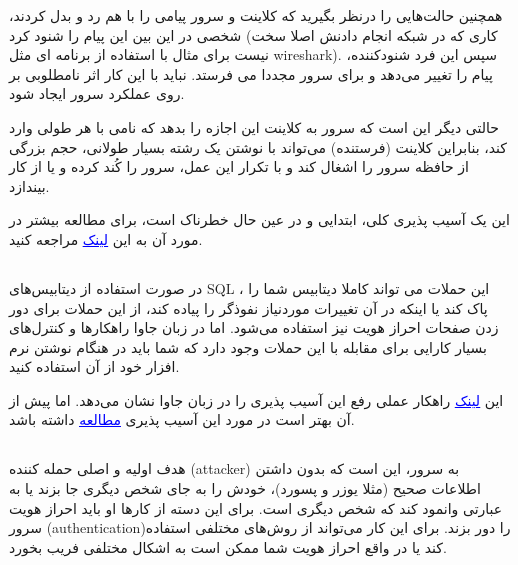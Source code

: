 \documentclass[]{article}
\begin{document}
همچنین حالت‌هایی را درنظر بگیرید که کلاینت و سرور پیامی را با هم رد و بدل کردند،‌ شخصی در این بین این پیام را شنود کرد (‌کاری که در شبکه انجام دادنش اصلا سخت نیست برای مثال با استفاده از برنامه ای مثل wireshark). سپس این فرد شنودکننده،‌ پیام را تغییر می‌دهد و برای سرور مجددا می فرستد. نباید با این کار اثر نامطلوبی بر روی عملکرد سرور ایجاد شود.

\bigskip

حالتی دیگر این است که سرور به کلاینت این اجازه را بدهد که نامی با هر طولی وارد کند، بنابراین کلاینت (فرستنده)‌ می‌تواند با نوشتن یک رشته بسیار طولانی، حجم بزرگی از حافظه سرور را اشغال کند و با تکرار این عمل،‌ سرور را کُند کرده و یا از کار بیندازد.

این یک آسیب پذیری کلی، ابتدایی و در عین حال خطرناک است،‌ برای مطالعه بیشتر در مورد آن به این \href{https://cwe.mitre.org/data/definitions/20.html}{\textcolor{blue}{\underline{{لینک}}}} مراجعه کنید.




\subsection*{{}}
در صورت استفاده از دیتابیس‌های SQL ، این حملات می تواند کاملا دیتابیس شما را پاک کند یا اینکه در آن تغییرات مورد‌نیاز نفوذگر را پیاده کند، از این حملات برای دور زدن صفحات احراز هویت نیز استفاده می‌شود. اما در زبان جاوا راهکار‌ها و کنترل‌های بسیار کارایی برای مقابله با این حملات وجود دارد که شما باید در هنگام نوشتن نرم افزار خود از آن استفاده کنید.

این \href {"https://software-security.sans.org/developer-how-to/fix-sql-injection-in-java-using-prepared-callable-statement"}{\textcolor{blue}{\underline{لینک}}} 
راهکار عملی رفع این آسیب پذیری را در زبان جاوا نشان می‌دهد. اما پیش از آن بهتر است در مورد این آسیب پذیری \href {https://www.w3schools.com/sql/sql_injection.asp}{\textcolor{blue}{\underline{مطالعه}}} داشته باشد.



\subsection*{{}}
هدف اولیه و اصلی حمله کننده (attacker) به سرور، این است که بدون داشتن اطلاعات صحیح (مثلا یوزر و پسورد)، خودش را به جای شخص دیگری جا بزند یا به عبارتی وانمود کند که شخص دیگری است. برای این دسته از کارها او باید احراز هویت سرور (authentication)‌را دور بزند. برای این کار می‌تواند از روش‌های مختلفی استفاده کند یا در واقع احراز هویت شما ممکن است به اشکال مختلفی فریب بخورد.
\end{document}
